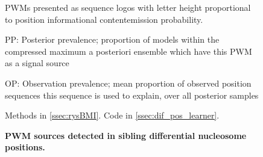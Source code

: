 \documentclass{ut-thesis}
\begin{document}
\begin{NoHyper}
\begin{figure}[!h]
    \caption{{\bf PWM sources detected in sibling differential nucleosome positions.}}
    PWMs presented as sequence logos with letter height proportional to position informational content\/emission probability.

    PP: Posterior prevalence; proportion of models within the compressed maximum a posteriori ensemble which have this PWM as a signal source

    OP: Observation prevalence; mean proportion of observed position sequences this sequence is used to explain, over all posterior samples

    Methods in \autoref{ssec:rysBMI}.
    Code in \autoref{ssec:dif_pos_learner}.
    \label{sibmotifs}
\end{figure}


\end{NoHyper}
\end{document}

